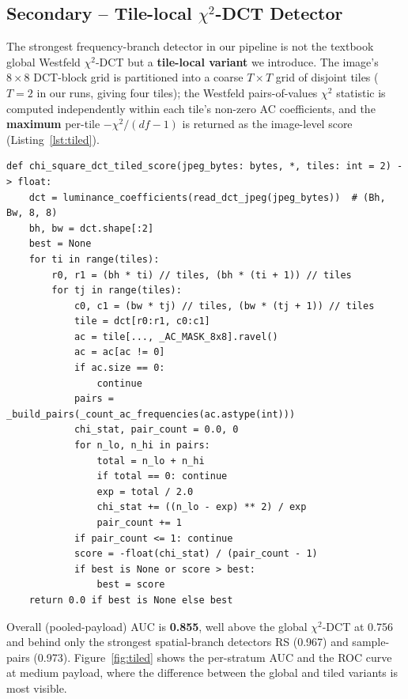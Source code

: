 \documentclass[10pt,twocolumn,a4paper]{article}
\begin{document}
\subsection{Secondary -- Tile-local $\chi^2$-DCT Detector}
\label{sec:tiled}

The strongest frequency-branch detector in our pipeline is not the textbook global Westfeld $\chi^2$-DCT but a \textbf{tile-local variant} we introduce. The image's $8\!\times\!8$ DCT-block grid is partitioned into a coarse $T\!\times\!T$ grid of disjoint tiles ($T\!=\!2$ in our runs, giving four tiles); the Westfeld pairs-of-values $\chi^2$ statistic is computed independently within each tile's non-zero AC coefficients, and the \textbf{maximum} per-tile $-\chi^2/(df\!-\!1)$ is returned as the image-level score (Listing~\ref{lst:tiled}).

\begin{lstlisting}[label={lst:tiled},caption={Tile-local $\chi^2$-DCT detector. Partition the DCT-block grid into $T\!\times\!T$ disjoint tiles, evaluate the Westfeld test inside each, and return the max per-tile underflow-free score.}]
def chi_square_dct_tiled_score(jpeg_bytes: bytes, *, tiles: int = 2) -> float:
    dct = luminance_coefficients(read_dct_jpeg(jpeg_bytes))  # (Bh, Bw, 8, 8)
    bh, bw = dct.shape[:2]
    best = None
    for ti in range(tiles):
        r0, r1 = (bh * ti) // tiles, (bh * (ti + 1)) // tiles
        for tj in range(tiles):
            c0, c1 = (bw * tj) // tiles, (bw * (tj + 1)) // tiles
            tile = dct[r0:r1, c0:c1]
            ac = tile[..., _AC_MASK_8x8].ravel()
            ac = ac[ac != 0]
            if ac.size == 0:
                continue
            pairs = _build_pairs(_count_ac_frequencies(ac.astype(int)))
            chi_stat, pair_count = 0.0, 0
            for n_lo, n_hi in pairs:
                total = n_lo + n_hi
                if total == 0: continue
                exp = total / 2.0
                chi_stat += ((n_lo - exp) ** 2) / exp
                pair_count += 1
            if pair_count <= 1: continue
            score = -float(chi_stat) / (pair_count - 1)
            if best is None or score > best:
                best = score
    return 0.0 if best is None else best
\end{lstlisting}

Overall (pooled-payload) AUC is \textbf{0.855}, well above the global $\chi^2$-DCT at 0.756 and behind only the strongest spatial-branch detectors RS (0.967) and sample-pairs (0.973). Figure~\ref{fig:tiled} shows the per-stratum AUC and the ROC curve at medium payload, where the difference between the global and tiled variants is most visible.
\end{document}
